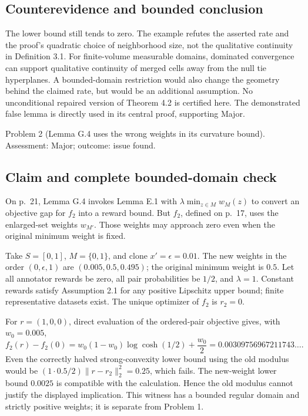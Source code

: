\documentclass[10pt]{article}
\begin{document}
\subsection*{Counterevidence and bounded conclusion}
The lower bound still tends to zero. The example refutes the asserted rate and the proof’s quadratic choice of neighborhood size, not the qualitative continuity in Definition 3.1. For finite-volume measurable domains, dominated convergence can support qualitative continuity of merged cells away from the null tie hyperplanes. A bounded-domain restriction would also change the geometry behind the claimed rate, but would be an additional assumption. No unconditional repaired version of Theorem 4.2 is certified here. The demonstrated false lemma is directly used in its central proof, supporting Major.\par
Problem 2 (Lemma G.4 uses the wrong weights in its curvature bound).  Assessment: Major; outcome: issue found.\par
\subsection*{Claim and complete bounded-domain check}
On p. 21, Lemma G.4 invokes Lemma E.1 with \(\lambda\min_{z\in M}w_M(z)\) to convert an objective gap for \(f_2\) into a reward bound. But \(f_2\), defined on p. 17, uses the enlarged-set weights \(w_{M'}\). Those weights may approach zero even when the original minimum weight is fixed.\par
Take \(S=[0,1]\), \(M=\{0,1\}\), and clone \(x'=\epsilon=0.01\). The new weights in the order \((0,\epsilon,1)\) are \((0.005,0.5,0.495)\); the original minimum weight is \(0.5\). Let all annotator rewards be zero, all pair probabilities be \(1/2\), and \(\lambda=1\). Constant rewards satisfy Assumption 2.1 for any positive Lipschitz upper bound; finite representative datasets exist. The unique optimizer of \(f_2\) is \(r_2=0\).\par
For \(r=(1,0,0)\), direct evaluation of the ordered-pair objective gives, with \(w_0=0.005\), \[f_2(r)-f_2(0)
 =w_0(1-w_0)\log\cosh(1/2)+\frac{w_0}{2}
 =0.00309756967211743\ldots.\] Even the correctly halved strong-convexity lower bound using the old modulus would be \((1\cdot0.5/2)\|r-r_2\|_2^2=0.25\), which fails. The new-weight lower bound \(0.0025\) is compatible with the calculation. Hence the old modulus cannot justify the displayed implication. This witness has a bounded regular domain and strictly positive weights; it is separate from Problem 1.\par
\end{document}
